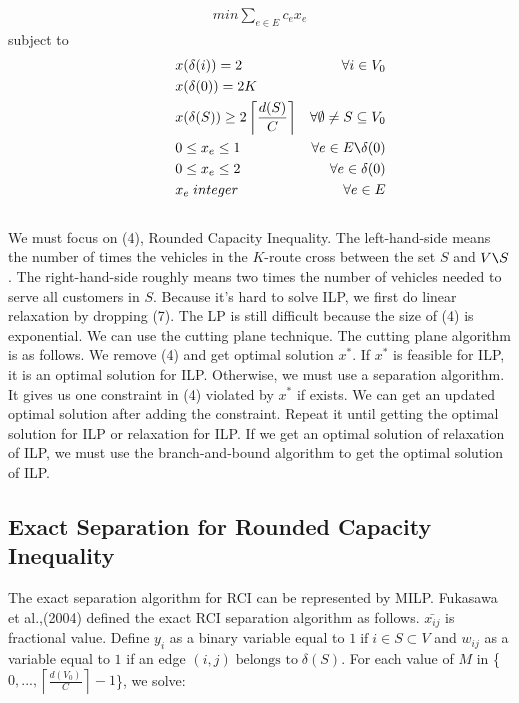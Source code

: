 \documentclass[11pt]{article}
\begin{document}
\begin{spacing}{1.5}
\begin{align}
     min \sum_{e \in E} c_ex_e
\end{align}
\qquad\qquad\qquad\qquad\qquad\qquad subject to
\begin{align}
    &&&&&&& x(\delta(i))=2   &\forall i \in V_0\\
    &&&&&&& x(\delta(0))=2K \\
    &&&&&&& x(\delta(S))\geq2\left\lceil\frac{d(S)}{C}\right\rceil &\forall\emptyset\neq S\subseteq V_0\\
    &&&&&&& 0\le x_e\le1  &\forall e\in E \texttt{\char`\\}\delta(0) \\
    &&&&&&& 0\le x_e\le2 &\forall e\in \delta(0) \\
    &&&&&&& x_e\;integer &\forall e\in E
\end{align}
\\We must focus on (4), Rounded Capacity Inequality. The left-hand-side means the number of times the vehicles in the $K$-route cross between the set $S$ and $V\texttt{\char`\\}S$. The right-hand-side roughly means two times the number of vehicles needed to serve all customers in $S$.
\indent Because it's hard to solve ILP, we first do linear relaxation by dropping (7). The LP is still difficult because the size of (4) is exponential. We can use the cutting plane technique. The cutting plane algorithm is as follows. We remove (4) and get optimal solution $x^*$. If $x^*$ is feasible for ILP, it is an optimal solution for ILP. Otherwise, we must use a separation algorithm. It gives us one constraint in (4) violated by $x^*$ if exists. We can get an updated optimal solution after adding the constraint. Repeat it until getting the optimal solution for ILP or relaxation for ILP. If we get an optimal solution of relaxation of ILP, we must use the branch-and-bound algorithm to get the optimal solution of ILP.


{\centering\subsection {Exact Separation for Rounded Capacity Inequality}}
The exact separation algorithm for RCI can be represented by MILP. Fukasawa et al.,(2004) defined the exact RCI separation algorithm as follows\cite{RCI}. $\bar{x_{ij}}$ is fractional value. Define $y_i$ as a binary variable equal to $1\;\text{if}\; i\in S\subset V$ and $w_{ij}$ as a variable equal to $1$ if an edge $(i,j)\; \text{belongs to}\; \delta(S)$. For each value of $M$ in \{$0,...,\left\lceil\frac{d(V_0)}{C}\right\rceil-1$\}, we solve:
    

\end{spacing}
\end{document}
